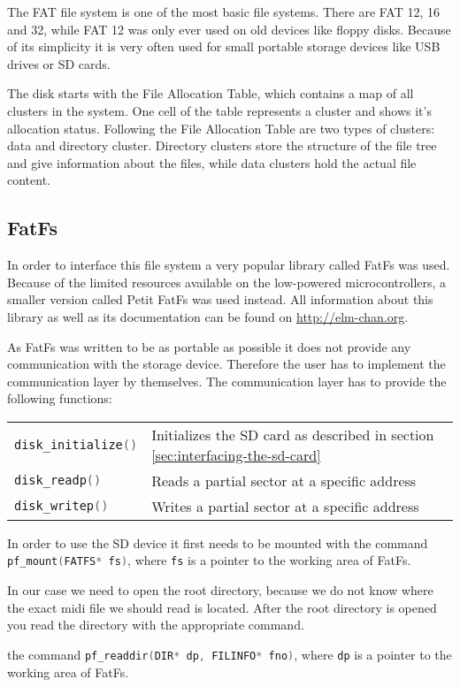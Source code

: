 The FAT file system is one of the most basic file systems. There are FAT 12, 16 and 32, while FAT 12 was only ever used on old devices like floppy disks. Because of its simplicity it is very often used for small portable storage devices like USB drives or SD cards. 

The disk starts with the File Allocation Table, which contains a map of all clusters in the system. One cell of the table represents a cluster and shows it's allocation status. Following the File Allocation Table are two types of clusters: data and directory cluster. Directory clusters store the structure of the file tree and give information about the files, while data clusters hold the actual file content.

\subsection{FatFs}

In order to interface this file system a very popular library called FatFs was used. Because of the limited resources available on the low-powered microcontrollers, a smaller version called Petit FatFs was used instead. All information about this library as well as its documentation can be found on \href{http://elm-chan.org/}{http://elm-chan.org}.

As FatFs was written to be as portable as possible it does not provide any communication with the storage device. Therefore the user has to implement the communication layer by themselves. %
The communication layer has to provide the following functions:

\begin{tabular}{ll}
    \lstinline[language=C]!disk_initialize()! &  Initializes the SD card as described in section \ref{sec:interfacing-the-sd-card}\\
    \lstinline[language=C]!disk_readp()! & Reads a partial sector at a specific address\\
    \lstinline[language=C]!disk_writep()! & Writes a partial sector at a specific address\\
\end{tabular}

In order to use the SD device it first needs to be mounted with the command \lstinline[language=C]!pf_mount(FATFS* fs)!, where \lstinline[language=C]!fs! is a pointer to the working area of FatFs.



In our case we need to open the root directory, because we do not know where the exact midi file we should read is located. After the root directory is opened you read the directory with the appropriate command.



the command \lstinline[language=C]!pf_readdir(DIR* dp, FILINFO* fno)!, where \lstinline[language=C]!dp! is a pointer to the working area of FatFs.


